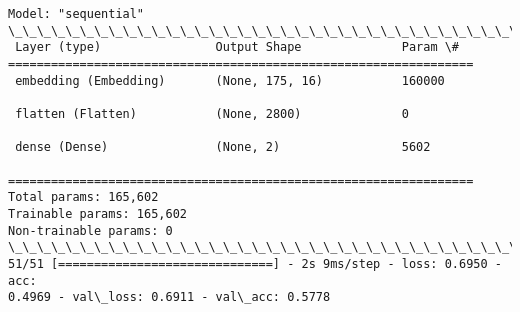 \documentclass[11pt]{article}
\begin{document}
    \begin{Verbatim}[commandchars=\\\{\}]
Model: "sequential"
\_\_\_\_\_\_\_\_\_\_\_\_\_\_\_\_\_\_\_\_\_\_\_\_\_\_\_\_\_\_\_\_\_\_\_\_\_\_\_\_\_\_\_\_\_\_\_\_\_\_\_\_\_\_\_\_\_\_\_\_\_\_\_\_\_
 Layer (type)                Output Shape              Param \#
=================================================================
 embedding (Embedding)       (None, 175, 16)           160000

 flatten (Flatten)           (None, 2800)              0

 dense (Dense)               (None, 2)                 5602

=================================================================
Total params: 165,602
Trainable params: 165,602
Non-trainable params: 0
\_\_\_\_\_\_\_\_\_\_\_\_\_\_\_\_\_\_\_\_\_\_\_\_\_\_\_\_\_\_\_\_\_\_\_\_\_\_\_\_\_\_\_\_\_\_\_\_\_\_\_\_\_\_\_\_\_\_\_\_\_\_\_\_\_
51/51 [==============================] - 2s 9ms/step - loss: 0.6950 - acc:
0.4969 - val\_loss: 0.6911 - val\_acc: 0.5778
    \end{Verbatim}
\end{document}
